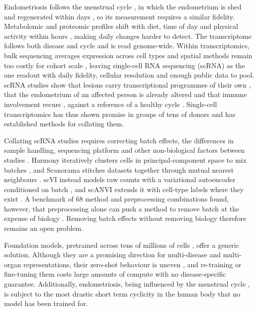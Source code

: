 Endometriosis follows the menstrual cycle
\citep{who2025endometriosis,garciaalonso2021endometrium}, in which the
endometrium is shed and regenerated within days
\citep{salamonsen2021endometrial}, so its measurement requires a similar
fidelity. Metabolomic and proteomic profiles shift with diet, time of day
and physical activity within hours
\citep{dallmann2012circadian,depner2018mistimed,contrepois2020molecular},
making daily changes harder to detect. The transcriptome follows both
disease and cycle \citep{mareckova2024heca} and is read genome-wide. Within
transcriptomics, bulk sequencing averages expression across cell types
\citep{haque2017practical} and spatial methods remain too costly for cohort
scale \citep{moses2022museum}, leaving single-cell RNA sequencing (scRNA) as
the one readout with daily fidelity, cellular resolution and enough public
data to pool. scRNA studies show that lesions carry transcriptional
programmes of their own \citep{fonseca2023endometriosis,tan2022singlecell},
that the endometrium of an affected person is already altered
\citep{duempelmann2026endometrium,shih2022menstrual} and that immune
involvement recurs \citep{huang2023immune,chen2022adenomyosis}, against a
reference of a healthy cycle \citep{mareckova2024heca}. Single-cell
transcriptomics has thus shown promise in groups of tens of donors
\citep{duempelmann2026endometrium,mareckova2024heca} and has established
methods for collating them.

Collating scRNA studies requires correcting batch effects, the differences
in sample handling, sequencing platform and other non-biological factors
between studies \citep{luecken2022benchmarking}. Harmony iteratively
clusters cells in principal-component space to mix batches
\citep{korsunsky2019harmony}, and Scanorama stitches datasets together
through mutual nearest neighbours \citep{hie2019scanorama}. scVI instead
models raw counts with a variational autoencoder conditioned on batch
\citep{lopez2018scvi}, and scANVI extends it with cell-type labels where they
exist \citep{xu2021scanvi}. A benchmark of 68 method and preprocessing
combinations found, however, that preprocessing alone can push a method to
remove batch at the expense of biology \citep{luecken2022benchmarking}.
Removing batch effects without removing biology therefore remains an open
problem.

Foundation models, pretrained across tens of millions of cells
\citep{cui2024scgpt,theodoris2023geneformer,hao2024scfoundation,heimberg2025scimilarity},
offer a generic solution. Although they are a promising direction for 
multi-disease and multi-organ representations,
their zero-shot behaviour is uneven \citep{kedzierska2025zeroshot}, and
re-training or fine-tuning them costs large amounts of compute with no
disease-specific guarantee.
Additionally, endometriosis, being influenced by the menstrual 
cycle \citep{who2025endometriosis,garciaalonso2021endometrium}, is subject 
to the most drastic short term cyclicity in the human body 
\citep{salamonsen2021endometrial} that no model has been trained for.

